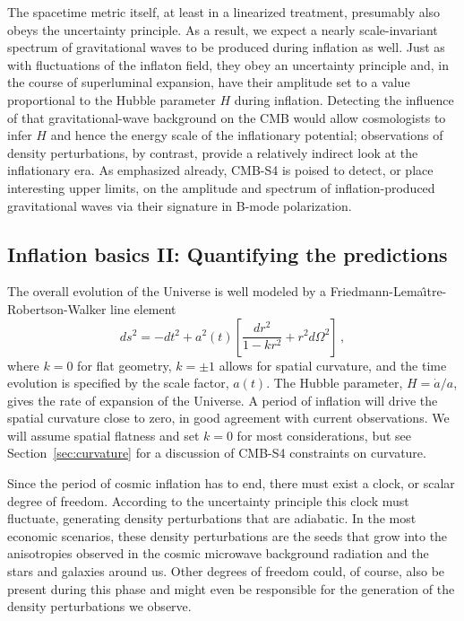 The spacetime metric itself, at least in a linearized treatment, presumably also obeys the uncertainty principle. As a result, we expect a nearly scale-invariant spectrum of gravitational waves to be produced during inflation as well. Just as with fluctuations of the inflaton field, they obey an uncertainty principle and, in the course of superluminal expansion, have their amplitude set to a value proportional to the Hubble parameter $H$ during inflation. Detecting the influence of that gravitational-wave background on the CMB would allow cosmologists to infer $H$ and hence the energy scale of the inflationary potential; observations of density perturbations, by contrast, provide a relatively indirect look at the inflationary era. As emphasized already, CMB-S4 is poised to detect, or place interesting upper limits, on the amplitude and spectrum of inflation-produced gravitational waves via their signature in B-mode polarization. 


\subsection{Inflation basics II: Quantifying the predictions}

The overall evolution of the Universe is well modeled by a Friedmann-Lema\^{\i}tre-Robertson-Walker line element
\begin{equation}
ds^2=-dt^2+a^2(t)\left[\frac{dr^2}{1-kr^2}+r^2d\Omega^2\right]\,,
\end{equation}
where $k=0$ for flat geometry, $k=\pm1$ allows for spatial curvature, and the time evolution is specified by the scale factor, $a(t)$. The Hubble parameter, $H=\dot{a}/a$, gives the rate of expansion of the Universe. A period of inflation will drive the spatial curvature close to zero, in good agreement with current observations. We will assume spatial flatness and set $k=0$ for most considerations, but see Section~\ref{sec:curvature} for a discussion of CMB-S4 constraints on curvature. 

Since the period of cosmic inflation has to end, there must exist a clock, or scalar degree of freedom. According to the uncertainty principle this clock must fluctuate, generating density perturbations that are adiabatic. In the most economic scenarios, these density perturbations are the seeds that grow into the anisotropies observed in the cosmic microwave background radiation and the stars and galaxies around us. Other degrees of freedom could, of course, also be present during this phase and might even be responsible for the generation of the density perturbations we observe. 

